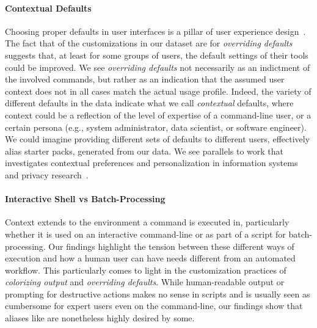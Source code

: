 \paragraph*{\bf Contextual Defaults}

Choosing proper defaults in user interfaces is a pillar of user experience design~\cite{nielsen2005power}.
The fact that  of the customizations in our dataset are for \emph{overriding defaults} suggests that, at least for some groups of users, the default settings of their tools could be improved.
We see \emph{overriding defaults} not necessarily as an indictment of the involved commands, but rather as an indication that the assumed user context does not in all cases match the actual usage profile.
Indeed, the variety of different defaults in the data indicate what we call \emph{contextual} defaults, where context could be a reflection of the level of expertise of a command-line user, or a certain persona (e.g., system administrator, data scientist, or software engineer).
We could imagine providing different sets of defaults to different users, effectively alias starter packs, generated from our data.
We see parallels to work that investigates contextual preferences and personalization in information systems~\cite{de:15, stefanidis:11} and privacy research~\cite{wijesekera:18, alom:19}. 

\paragraph*{\bf Interactive Shell vs Batch-Processing}

Context extends to the environment a command is executed in, particularly whether it is used on an interactive command-line or as part of a script for batch-processing.
Our findings highlight the tension between these different ways of execution and how a human user can have needs different from an automated workflow.
This particularly comes to light in the customization practices of \emph{colorizing output} and \emph{overriding defaults}.
While human-readable output or prompting for destructive actions makes no sense in scripts and is usually seen as cumbersome for expert users even on the command-line, our findings show that aliases like  are nonetheless highly desired by some.
